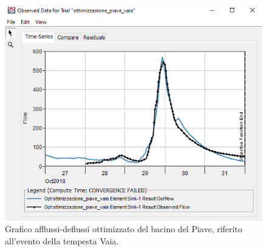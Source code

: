 \begin{figure}[H]\centering
    \includegraphics[scale=1]{immagini/ottim_piave.PNG}
    \caption{Grafico afflussi-deflussi ottimizzato del bacino del Piave, riferito all'evento della tempesta Vaia.}
        \label{ottim_piave}    
\end{figure}